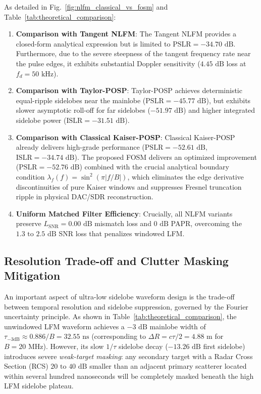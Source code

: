\documentclass[journal,compsoc]{IEEEtran}
\begin{document}
As detailed in Fig.~\ref{fig:nlfm_classical_vs_fosm} and Table~\ref{tab:theoretical_comparison}:
\begin{enumerate}
    \item \textbf{Comparison with Tangent NLFM}: The Tangent NLFM provides a closed-form analytical expression but is limited to $\text{PSLR} = -34.70\text{ dB}$. Furthermore, due to the severe steepness of the tangent frequency rate near the pulse edges, it exhibits substantial Doppler sensitivity ($4.45\text{ dB}$ loss at $f_d = 50\text{ kHz}$).
    \item \textbf{Comparison with Taylor-POSP}: Taylor-POSP achieves deterministic equal-ripple sidelobes near the mainlobe ($\text{PSLR} = -45.77\text{ dB}$), but exhibits slower asymptotic roll-off for far sidelobes ($-51.97\text{ dB}$) and higher integrated sidelobe power ($\text{ISLR} = -31.51\text{ dB}$).
    \item \textbf{Comparison with Classical Kaiser-POSP}: Classical Kaiser-POSP already delivers high-grade performance ($\text{PSLR} = -52.61\text{ dB}$, $\text{ISLR} = -34.74\text{ dB}$). The proposed FOSM delivers an optimized improvement ($\text{PSLR} = -52.76\text{ dB}$) combined with the crucial analytical boundary condition $\lambda_f(f) = \sin^2(\pi |f/B|)$, which eliminates the edge derivative discontinuities of pure Kaiser windows and suppresses Fresnel truncation ripple in physical DAC/SDR reconstruction.
    \item \textbf{Uniform Matched Filter Efficiency}: Crucially, all NLFM variants preserve $L_{\text{SNR}} = 0.00\text{ dB}$ mismatch loss and $0\text{ dB}$ PAPR, overcoming the $1.3\text{ to }2.5\text{ dB}$ SNR loss that penalizes windowed LFM.
\end{enumerate}

\subsection{Resolution Trade-off and Clutter Masking Mitigation}
An important aspect of ultra-low sidelobe waveform design is the trade-off between temporal resolution and sidelobe suppression, governed by the Fourier uncertainty principle. As shown in Table~\ref{tab:theoretical_comparison}, the unwindowed LFM waveform achieves a $-3\text{ dB}$ mainlobe width of $\tau_{-3\text{dB}} \approx 0.886/B = 32.55\text{ ns}$ (corresponding to $\Delta R = c\tau/2 = 4.88\text{ m}$ for $B = 20\text{ MHz}$). However, its slow $1/\tau$ sidelobe decay ($-13.26\text{ dB}$ first sidelobe) introduces severe \textit{weak-target masking}: any secondary target with a Radar Cross Section (RCS) $20\text{ to }40\text{ dB}$ smaller than an adjacent primary scatterer located within several hundred nanoseconds will be completely masked beneath the high LFM sidelobe plateau.
\end{document}
